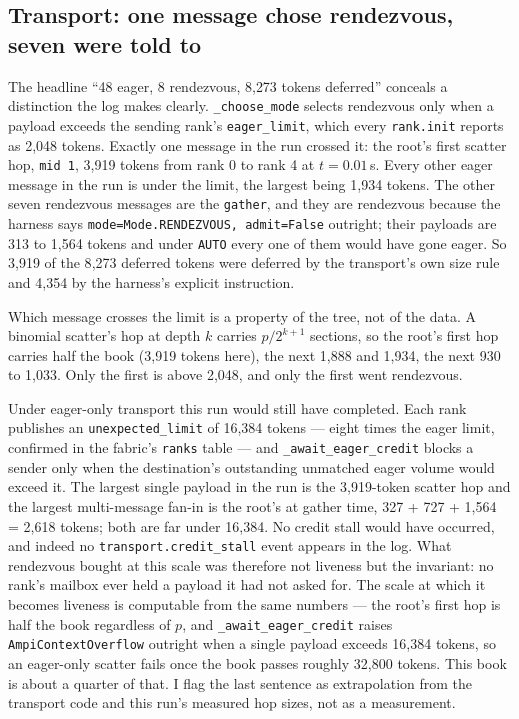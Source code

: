 \documentclass[11pt]{article}
\begin{document}
\subsection*{Transport: one message chose rendezvous, seven were told to}

The headline ``48 eager, 8 rendezvous, 8{,}273 tokens deferred'' conceals a distinction the
log makes clearly. \texttt{\_choose\_mode} selects rendezvous only when a payload exceeds
the sending rank's \texttt{eager\_limit}, which every \texttt{rank.init} reports as 2{,}048
tokens. Exactly one message in the run crossed it: the root's first scatter hop,
\texttt{mid 1}, 3{,}919 tokens from rank 0 to rank 4 at $t=0.01$\,s. Every other eager
message in the run is under the limit, the largest being 1{,}934 tokens. The other seven
rendezvous messages are the \texttt{gather}, and they are rendezvous because the harness
says \texttt{mode=Mode.RENDEZVOUS, admit=False} outright; their payloads are 313 to 1{,}564
tokens and under \texttt{AUTO} every one of them would have gone eager. So 3{,}919 of the
8{,}273 deferred tokens were deferred by the transport's own size rule and 4{,}354 by the
harness's explicit instruction.

Which message crosses the limit is a property of the tree, not of the data. A binomial
scatter's hop at depth $k$ carries $p/2^{k+1}$ sections, so the root's first hop carries
half the book (3{,}919 tokens here), the next 1{,}888 and 1{,}934, the next 930 to 1{,}033.
Only the first is above 2{,}048, and only the first went rendezvous.

Under eager-only transport this run would still have completed. Each rank publishes an
\texttt{unexpected\_limit} of 16{,}384 tokens --- eight times the eager limit, confirmed in
the fabric's \texttt{ranks} table --- and \texttt{\_await\_eager\_credit} blocks a sender
only when the destination's outstanding unmatched eager volume would exceed it. The
largest single payload in the run is the 3{,}919-token scatter hop and the largest
multi-message fan-in is the root's at gather time, 327 + 727 + 1{,}564 = 2{,}618 tokens;
both are far under 16{,}384. No credit stall would have
occurred, and indeed no \texttt{transport.credit\_stall} event appears in the log. What
rendezvous bought at this scale was therefore not liveness but the invariant: no rank's
mailbox ever held a payload it had not asked for. The scale at which it becomes liveness is
computable from the same numbers --- the root's first hop is half the book regardless of
$p$, and \texttt{\_await\_eager\_credit} raises \texttt{AmpiContextOverflow} outright when a
single payload exceeds 16{,}384 tokens, so an eager-only scatter fails once the book passes
roughly 32{,}800 tokens. This book is about a quarter of that. I flag the last sentence as
extrapolation from the transport code and this run's measured hop sizes, not as a
measurement.
\end{document}
